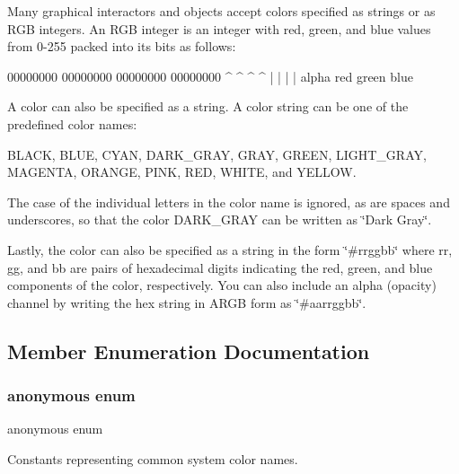 Many graphical interactors and objects accept colors specified as strings or as R\+GB integers. An R\+GB integer is an integer with red, green, and blue values from 0-\/255 packed into its bits as follows\+:


\begin{DoxyPre}
00000000 00000000 00000000 00000000
   ^        ^        ^        ^
   |        |        |        |
 alpha     red     green     blue
\end{DoxyPre}


A color can also be specified as a string. A color string can be one of the predefined color names\+:

{\ttfamily B\+L\+A\+CK}, {\ttfamily B\+L\+UE}, {\ttfamily C\+Y\+AN}, {\ttfamily D\+A\+R\+K\+\_\+\+G\+R\+AY}, {\ttfamily G\+R\+AY}, {\ttfamily G\+R\+E\+EN}, {\ttfamily L\+I\+G\+H\+T\+\_\+\+G\+R\+AY}, {\ttfamily M\+A\+G\+E\+N\+TA}, {\ttfamily O\+R\+A\+N\+GE}, {\ttfamily P\+I\+NK}, {\ttfamily R\+ED}, {\ttfamily W\+H\+I\+TE}, and {\ttfamily Y\+E\+L\+L\+OW}.

The case of the individual letters in the color name is ignored, as are spaces and underscores, so that the color {\ttfamily D\+A\+R\+K\+\_\+\+G\+R\+AY} can be written as {\ttfamily \char`\"{}\+Dark Gray\char`\"{}}.

Lastly, the color can also be specified as a string in the form {\ttfamily \char`\"{}\#rrggbb\char`\"{}} where {\ttfamily rr}, {\ttfamily gg}, and {\ttfamily bb} are pairs of hexadecimal digits indicating the red, green, and blue components of the color, respectively. You can also include an alpha (opacity) channel by writing the hex string in A\+R\+GB form as {\ttfamily \char`\"{}\#aarrggbb\char`\"{}}. 

\subsection{Member Enumeration Documentation}
\mbox{\label{classGColor_a06fc87d81c62e9abb8790b6e5713c55b}} 
\subsubsection{\texorpdfstring{anonymous enum}{anonymous enum}}
{\footnotesize\ttfamily anonymous enum}



Constants representing common system color names. 

